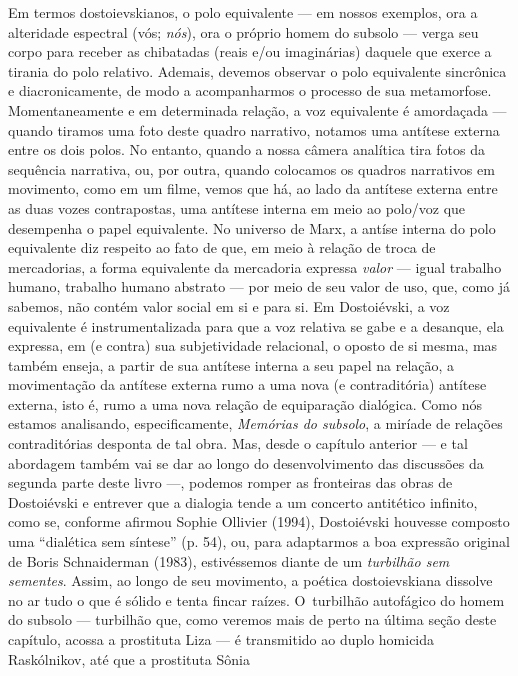 Em termos dostoievskianos, o polo equivalente --- em nossos exemplos, ora
a alteridade espectral (vós; \emph{nós}), ora o próprio homem do subsolo
--- verga seu corpo para receber as chibatadas (reais e/ou imaginárias)
daquele que exerce a tirania do polo relativo. Ademais, devemos observar
o polo equivalente sincrônica e diacronicamente, de modo a acompanharmos
o processo de sua metamorfose. Momentaneamente e em determinada relação,
a voz equivalente é amordaçada --- quando tiramos uma foto deste quadro
narrativo, notamos uma antítese externa entre os dois polos. No entanto,
quando a nossa câmera analítica tira fotos da sequência narrativa, ou,
por outra, quando colocamos os quadros narrativos em movimento, como em
um filme, vemos que há, ao lado da antítese externa entre as duas vozes
contrapostas, uma antítese interna em meio ao polo/voz que desempenha o
papel equivalente. No universo de Marx, a antíse interna do polo
equivalente diz respeito ao fato de que, em meio à relação de troca de
mercadorias, a forma equivalente da mercadoria expressa \emph{valor} ---
igual trabalho humano, trabalho humano abstrato --- por meio de seu valor
de uso, que, como já sabemos, não contém valor social em si e para si.
Em Dostoiévski, a voz equivalente é instrumentalizada para que a voz
relativa se gabe e a desanque, ela expressa, em (e contra) sua
subjetividade relacional, o oposto de si mesma, mas também enseja, a
partir de sua antítese interna a seu papel na relação, a movimentação da
antítese externa rumo a uma nova (e contraditória) antítese externa,
isto é, rumo a uma nova relação de equiparação dialógica. Como nós
estamos analisando, especificamente, \emph{Memórias do subsolo}, a
miríade de relações contraditórias desponta de tal obra. Mas, desde o
capítulo anterior --- e tal abordagem também vai se dar ao longo do
desenvolvimento das discussões da segunda parte deste livro ---, podemos
romper as fronteiras das obras de Dostoiévski e entrever que a dialogia
tende a um concerto antitético infinito, como se, conforme afirmou
Sophie Ollivier (1994), Dostoiévski houvesse composto uma ``dialética
sem síntese'' (p. 54), ou, para adaptarmos a boa expressão original de
Boris Schnaiderman (1983), estivéssemos diante de um \emph{turbilhão sem
sementes}. Assim, ao longo de seu movimento, a poética dostoievskiana
dissolve no ar tudo o que é sólido e tenta fincar raízes. O~turbilhão
autofágico do homem do subsolo --- turbilhão que, como veremos mais de
perto na última seção deste capítulo, acossa a prostituta Liza --- é
transmitido ao duplo homicida Raskólnikov, até que a prostituta Sônia
